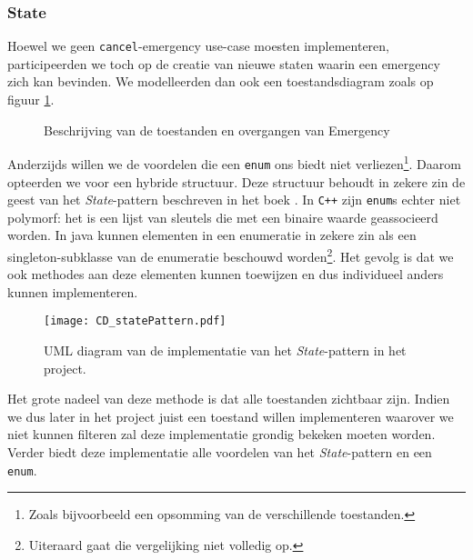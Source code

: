 \subsubsection{State}
Hoewel we geen \verb+cancel+-emergency use-case moesten implementeren, participeerden we toch op de creatie van nieuwe staten waarin een emergency zich kan bevinden. We modelleerden dan ook een toestandsdiagram zoals op figuur \ref{fig:stateDiagramEmergency}.
\begin{figure}[htb]
\centering
{}
\caption{Beschrijving van de toestanden en overgangen van Emergency}
\label{fig:stateDiagramEmergency}
\end{figure}
Anderzijds willen we de voordelen die een \verb+enum+ ons biedt niet verliezen\footnote{Zoals bijvoorbeeld een opsomming van de verschillende toestanden.}. Daarom opteerden we voor een hybride structuur. Deze structuur behoudt in zekere zin de geest van het \textit{State}-pattern beschreven in het boek \cite{book:designpatterns}. In \verb#C++# zijn \verb+enum+s echter niet polymorf: het is een lijst van sleutels die met een binaire waarde geassocieerd worden. In java kunnen elementen in een enumeratie in zekere zin als een singleton-subklasse van de enumeratie beschouwd worden\footnote{Uiteraard gaat die vergelijking niet volledig op.}. Het gevolg is dat we ook methodes aan deze elementen kunnen toewijzen en dus individueel anders kunnen implementeren.
\begin{figure}[htb]
\texttt{[image: CD\_statePattern.pdf]}
\caption{UML diagram van de implementatie van het \textit{State}-pattern in het project.}
\label{fig:statePattern}
\end{figure}
Het grote nadeel van deze methode is dat alle toestanden zichtbaar zijn. Indien we dus later in het project juist een toestand willen implementeren waarover we niet kunnen filteren zal deze implementatie grondig bekeken moeten worden. Verder biedt deze implementatie alle voordelen van het \textit{State}-pattern en een \verb+enum+.
